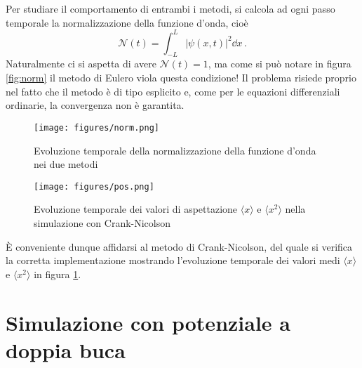 \documentclass[a4paper, titlepage]{article}
\begin{document}
Per studiare il comportamento di entrambi i metodi, si calcola ad ogni passo temporale la normalizzazione della funzione d'onda, cioè
\[
    \mathcal{N}(t) = \int_{-L}^L |\psi(x,t)|^2 \dd{x}\, .
\]
Naturalmente ci si aspetta di avere $\mathcal{N}(t) = 1$, ma come si può notare in figura \ref{fig:norm} il metodo di Eulero viola questa condizione!
Il problema risiede proprio nel fatto che il metodo è di tipo esplicito e, come per le equazioni differenziali ordinarie, la convergenza non è garantita. 

\begin{figure}[h!]
    \centering
    \begin{minipage}{0.49 \textwidth}
        \centering
        \texttt{[image: figures/norm.png]}
        \caption{Evoluzione temporale della normalizzazione della funzione d'onda nei due metodi}
        \label{fig:norm}
    \end{minipage}
    \begin{minipage}{0.49 \textwidth}
        \centering
        \texttt{[image: figures/pos.png]}
        \caption{Evoluzione temporale dei valori di aspettazione $\langle x \rangle$ e $\langle x^2 \rangle$ nella simulazione con Crank-Nicolson}
        \label{fig:pos}
    \end{minipage}
\end{figure}

È conveniente dunque affidarsi al metodo di Crank-Nicolson, del quale si verifica la corretta implementazione mostrando l'evoluzione temporale dei valori medi $\langle x \rangle$ e $\langle x^2 \rangle$ in figura \ref{fig:pos}.



\section{Simulazione con potenziale a doppia buca}
\end{document}
